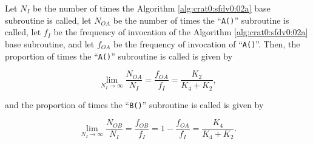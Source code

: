 \begin{vworklemmastatement}
\label{lem:crat0:sfdv0:sprc2:02}
Let $N_I$ be the number of times the Algorithm \ref{alg:crat0:sfdv0:02a} base subroutine
is called, let $N_{OA}$ be the number of times the 
``\texttt{A()}'' subroutine is called, let
$f_I$ be the frequency of invocation of the 
Algorithm \ref{alg:crat0:sfdv0:02a} base subroutine, and let 
$f_{OA}$ be the frequency of invocation of 
``\texttt{A()}''.  Then, the proportion of times the
``\texttt{A()}'' subroutine is called is given by

\begin{equation}
\label{eq:lem:crat0:sfdv0:sprc2:02:01}
\lim_{N_I\rightarrow\infty}\frac{N_{OA}}{N_I}
=
\frac{f_{OA}}{f_I}
=
\frac{K_2}{K_4 + K_2} ,
\end{equation} 

and the proportion of times the ``\texttt{B()}'' subroutine is called
is given by

\begin{equation}
\label{eq:lem:crat0:sfdv0:sprc2:02:02}
\lim_{N_I\rightarrow\infty}\frac{N_{OB}}{N_I}
=
\frac{f_{OB}}{f_I}
=
1 - \frac{f_{OA}}{f_I}
=
\frac{K_4}{K_4 + K_2} . 
\end{equation} 
\end{vworklemmastatement}
